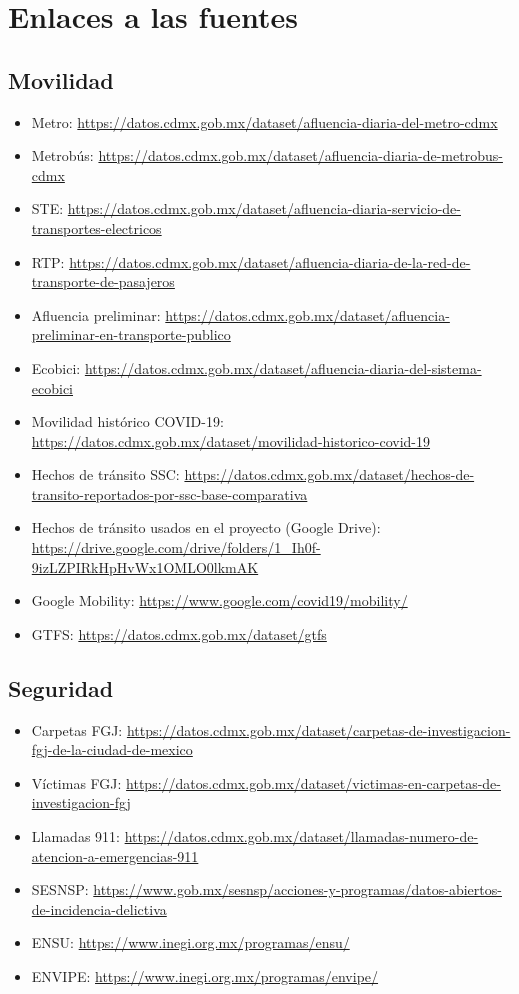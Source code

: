 \section{Enlaces a las fuentes}\label{app:enlaces}

{\small
\subsection*{Movilidad}
\begin{itemize}
  \item Metro: \url{https://datos.cdmx.gob.mx/dataset/afluencia-diaria-del-metro-cdmx}
  \item Metrobús: \url{https://datos.cdmx.gob.mx/dataset/afluencia-diaria-de-metrobus-cdmx}
  \item STE: \url{https://datos.cdmx.gob.mx/dataset/afluencia-diaria-servicio-de-transportes-electricos}
  \item RTP: \url{https://datos.cdmx.gob.mx/dataset/afluencia-diaria-de-la-red-de-transporte-de-pasajeros}
  \item Afluencia preliminar: \url{https://datos.cdmx.gob.mx/dataset/afluencia-preliminar-en-transporte-publico}
  \item Ecobici: \url{https://datos.cdmx.gob.mx/dataset/afluencia-diaria-del-sistema-ecobici}
  \item Movilidad histórico COVID-19: \url{https://datos.cdmx.gob.mx/dataset/movilidad-historico-covid-19}
  \item Hechos de tránsito SSC: \url{https://datos.cdmx.gob.mx/dataset/hechos-de-transito-reportados-por-ssc-base-comparativa}
  \item Hechos de tránsito usados en el proyecto (Google Drive): \url{https://drive.google.com/drive/folders/1_Ih0f-9izLZPIRkHpHvWx1OMLO0lkmAK}
  \item Google Mobility: \url{https://www.google.com/covid19/mobility/}
  \item GTFS: \url{https://datos.cdmx.gob.mx/dataset/gtfs}
\end{itemize}

\subsection*{Seguridad}
\begin{itemize}
  \item Carpetas FGJ: \url{https://datos.cdmx.gob.mx/dataset/carpetas-de-investigacion-fgj-de-la-ciudad-de-mexico}
  \item Víctimas FGJ: \url{https://datos.cdmx.gob.mx/dataset/victimas-en-carpetas-de-investigacion-fgj}
  \item Llamadas 911: \url{https://datos.cdmx.gob.mx/dataset/llamadas-numero-de-atencion-a-emergencias-911}
  \item SESNSP: \url{https://www.gob.mx/sesnsp/acciones-y-programas/datos-abiertos-de-incidencia-delictiva}
  \item ENSU: \url{https://www.inegi.org.mx/programas/ensu/}
  \item ENVIPE: \url{https://www.inegi.org.mx/programas/envipe/}
\end{itemize}

}
